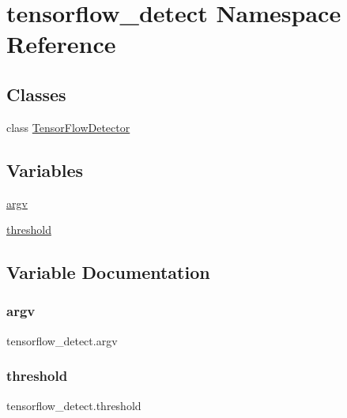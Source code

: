 \hypertarget{namespacetensorflow__detect}{}\section{tensorflow\+\_\+detect Namespace Reference}
\label{namespacetensorflow__detect}
\subsection*{Classes}
\begin{DoxyCompactItemize}
\item 
class \hyperlink{classtensorflow__detect_1_1_tensor_flow_detector}{Tensor\+Flow\+Detector}
\end{DoxyCompactItemize}
\subsection*{Variables}
\begin{DoxyCompactItemize}
\item 
\hyperlink{namespacetensorflow__detect_ab9f0bcfda000c7664a363cdb90e34c4f}{argv}
\item 
\hyperlink{namespacetensorflow__detect_a92f27be303bb36c28ed99f95a89104b1}{threshold}
\end{DoxyCompactItemize}


\subsection{Variable Documentation}
\mbox{\label{namespacetensorflow__detect_ab9f0bcfda000c7664a363cdb90e34c4f}} 
\subsubsection{\texorpdfstring{argv}{argv}}
{\footnotesize\ttfamily tensorflow\+\_\+detect.\+argv}

\mbox{\label{namespacetensorflow__detect_a92f27be303bb36c28ed99f95a89104b1}} 
\subsubsection{\texorpdfstring{threshold}{threshold}}
{\footnotesize\ttfamily tensorflow\+\_\+detect.\+threshold}


